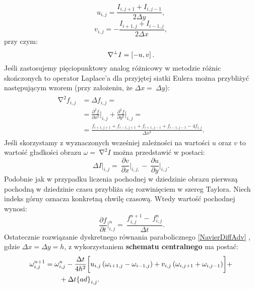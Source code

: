 \documentclass[12pt, twoside, openany]{report}
\theoremstyle{definition}
\begin{document}
\begin{equation}
u_{i,j}=\frac{I_{i,j+1}+I_{i,j-1}}{2\Delta y} 
\label{u}
,
\end{equation}
\begin{equation}
 v_{i,j}=-\frac{I_{i+1,j}+I_{i-1,j}}{2\Delta x}
\label{v}
,
\end{equation}
przy czym:
\begin{equation}\\
{\mathrm{\nabla }}^{\bot }I=\left[-u,v\right]
\label{gradI}
.
\end{equation}
Jeśli zastosujemy pięciopunktowy analog różnicowy \cite{blacksuccessive} w metodzie różnic skończonych to operator Laplace’a dla przyjętej siatki Eulera można przybliżyć następującym wzorem (przy założeniu, że $\Delta x=\ \Delta y$):
\begin{align}
\begin{aligned}
{\mathrm{\nabla }}^2f_{i,j} &= \Delta f_{i,j}=\\[1ex]
&={\frac{{\partial }^2f}{\partial x^2}}\bigg|_{i,j}+{\frac{{\partial }^2f}{\partial y^2}}\bigg|_{i,j}=\\
&=\frac{f_{i+1,j+1}+f_{i-1,j+1}+f_{i+1,j-1}+f_{i-1,j-1}-4f_{i,j}}{\Delta x^2} .
\end{aligned}
\label{LaplaceOpr}
\end{align}
Jeśli skorzystamy z wyznaczonych wcześniej zależności na wartości $u$ oraz $v$ to wartość gładkości obrazu $\omega =\ {\mathrm{\nabla }}^2I$ można przedstawić w postaci: 
\begin{equation}
\Delta {I}\big|_{i,j}=\ {\frac{\partial v}{\partial x}}\bigg|_{i,j,}-\ {\frac{\partial u}{\partial y}}\bigg|_{i,j}
\label{discreteVorticity}
.
\end{equation}
Podobnie jak w przypadku liczenia pochodnej w dziedzinie obrazu pierwszą pochodną w dziedzinie czasu przybliża się rozwinięciem w szereg Taylora. Niech indeks górny oznacza konkretną chwilę czasową. Wtedy wartość pochodnej wynosi:
\begin{equation}
\ {{\frac{\partial f}{\partial t}}\bigg|^n_{i,j}=\ \frac{f^{n+1}_{i,j}-\ f^n_{i,j}}{\Delta t}}
\label{dfdt}
.
\end{equation}
Ostatecznie rozwiązanie dyskretnego równania parabolicznego \eqref{NavierDiffAdv} , gdzie $\Delta x= \Delta y=h$, z wykorzystaniem \textbf{schematu centralnego} ma postać:
\begin{align}
\omega ^{n+1}_{i,j} &= {\omega }^n_{i,j} - \frac{\Delta t}{4h^2}\biggl[u_{i,j} \left({\omega }_{i+1,j}
-{\omega }_{i-1,j}\right)+ v_{i,j} \left({\omega }_{i,j+1}+{\omega }_{i,j-1}\right)\biggr]+\notag\\ 
&\qquad + \Delta t{\left\{ad\right\}}_{i,j}.
\label{NavierDiffAdvCen}
\end{align}
\end{document}
